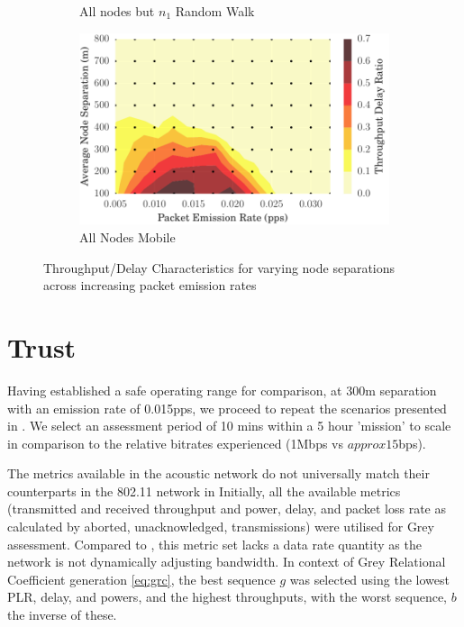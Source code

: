 \documentclass[runningheads,a4paper]{llncs}
\begin{document}
\begin{figure}
\begin{subfigure}{.5\textwidth}
  \caption{All nodes but $n_1$ Random Walk}
  \label{fig:2d_throughput_allbut1}
\end{subfigure}
\begin{subfigure}{.5\textwidth}
\centering
  \includegraphics[width=.9\linewidth]{img/2d_ratio_all_mobile.pdf}
  \caption{All Nodes Mobile}
  \label{fig:2d_throughput_all_mobile}
\end{subfigure}
\caption{Throughput/Delay Characteristics for varying node separations across increasing packet emission rates}
\label{fig:scenario_throughputratios_2d}
\end{figure}


\section{Trust}\label{sec:trustresultsanddiscussion}

Having established a safe operating range for comparison, at 300m separation with an emission rate of 0.015pps, we proceed to repeat the scenarios presented in \cite{Guo11}. We select an assessment period of 10 mins within a 5 hour 'mission' to scale in comparison to the relative bitrates experienced (1Mbps vs $approx15$bps).

The metrics available in the acoustic network do not universally match their counterparts in the 802.11 network in \cite{Guo11}
Initially, all the available metrics (transmitted and received throughput and power, delay, and packet loss rate as calculated by aborted, unacknowledged, transmissions) were utilised for Grey assessment. 
Compared to \cite{Guo11}, this metric set lacks a data rate quantity as the network is not dynamically adjusting bandwidth.
In context of Grey Relational Coefficient generation \eqref{eq:grc}, the best sequence $g$ was selected using the lowest PLR, delay, and powers, and the highest throughputs, with the worst sequence, $b$ the inverse of these.
\end{document}
